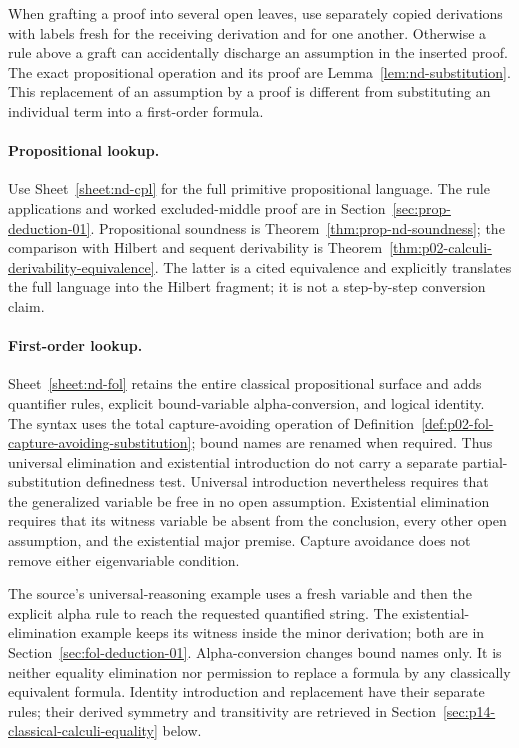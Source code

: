 When grafting a proof into several open leaves, use separately copied
derivations with labels fresh for the receiving derivation and for one
another.  Otherwise a rule above a graft can accidentally discharge an
assumption in the inserted proof.  The exact propositional operation and
its proof are Lemma~\ref{lem:nd-substitution}.  This replacement of an
assumption by a proof is different from substituting an individual term
into a first-order formula.

\paragraph{Propositional lookup.}
Use Sheet~\ref{sheet:nd-cpl} for the full primitive propositional language.
The rule applications and worked excluded-middle proof are in
Section~\ref{sec:prop-deduction-01}.  Propositional soundness is
Theorem~\ref{thm:prop-nd-soundness}; the comparison with Hilbert and sequent
derivability is Theorem~\ref{thm:p02-calculi-derivability-equivalence}.
The latter is a cited equivalence and explicitly translates the full
language into the Hilbert fragment; it is not a step-by-step conversion
claim.


\paragraph{First-order lookup.}
Sheet~\ref{sheet:nd-fol} retains the entire classical propositional surface
and adds quantifier rules, explicit bound-variable alpha-conversion, and
logical identity.  The syntax uses the total capture-avoiding operation of
Definition~\ref{def:p02-fol-capture-avoiding-substitution}; bound names are
renamed when required.  Thus universal elimination and existential
introduction do not carry a separate partial-substitution definedness
test.  Universal introduction nevertheless requires that the generalized
variable be free in no open assumption.  Existential elimination requires
that its witness variable be absent from the conclusion, every other open
assumption, and the existential major premise.  Capture avoidance does not
remove either eigenvariable condition.

The source's universal-reasoning example uses a fresh variable and then
the explicit alpha rule to reach the requested quantified string.
The existential-elimination example keeps its witness inside the minor
derivation; both are in Section~\ref{sec:fol-deduction-01}.
Alpha-conversion changes bound names only.  It is neither equality
elimination nor permission to replace a formula by any classically
equivalent formula.  Identity introduction and replacement have their
separate rules; their derived symmetry and transitivity are retrieved in
Section~\ref{sec:p14-classical-calculi-equality} below.

